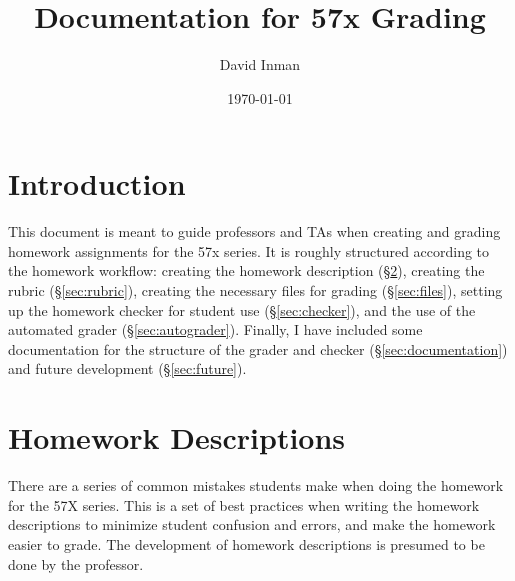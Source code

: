 \documentclass[12pt]{article}
\begin{document}
\title{Documentation for 57x Grading}
\author{David Inman}
\date{\today}
\maketitle

\tableofcontents{}

\section{Introduction}
This document is meant to guide professors and TAs when creating and grading homework assignments for the 57x series. It is roughly structured according to the homework workflow: creating the homework description (\S\ref{sec:homework}), creating the rubric (\S\ref{sec:rubric}), creating the necessary files for grading (\S\ref{sec:files}), setting up the homework checker for student use (\S\ref{sec:checker}), and the use of the automated grader (\S\ref{sec:autograder}). Finally, I have included some documentation for the structure of the grader and checker (\S\ref{sec:documentation}) and future development (\S\ref{sec:future}).

\section{Homework Descriptions} \label{sec:homework}
There are a series of common mistakes students make when doing the homework for the 57X series. This is a set of best practices when writing the homework descriptions to minimize student confusion and errors, and make the homework easier to grade. The development of homework descriptions is presumed to be done by the professor.
\end{document}
